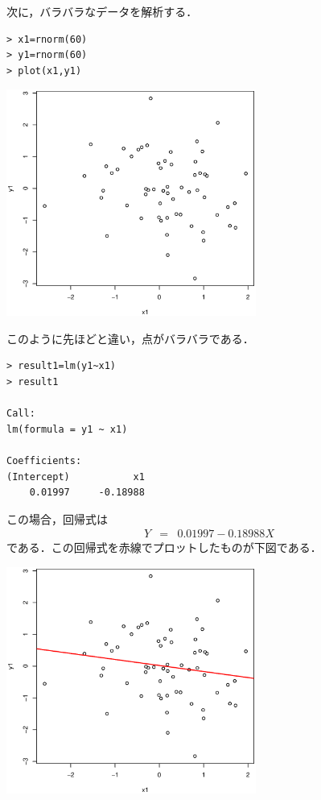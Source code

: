 \documentclass[a4paper,10pt,fleqn]{jarticle}
\begin{document}
次に，バラバラなデータを解析する．
\begin{breakbox}
\begin{verbatim}
> x1=rnorm(60)
> y1=rnorm(60)
> plot(x1,y1)
\end{verbatim}
\begin{center}
\includegraphics[width=8.2cm]{img/plot1.eps}
\end{center}
\end{breakbox}
このように先ほどと違い，点がバラバラである．
\begin{breakbox}
\begin{verbatim}
> result1=lm(y1~x1)
> result1

Call:
lm(formula = y1 ~ x1)

Coefficients:
(Intercept)           x1  
    0.01997     -0.18988  
\end{verbatim}
\end{breakbox}
この場合，回帰式は
\begin{eqnarray*}
Y&=&0.01997-0.18988X
\end{eqnarray*}
である．この回帰式を赤線でプロットしたものが下図である．
\begin{center}
\includegraphics[width=8.2cm]{img/abline1.eps}
\end{center}
\end{document}
